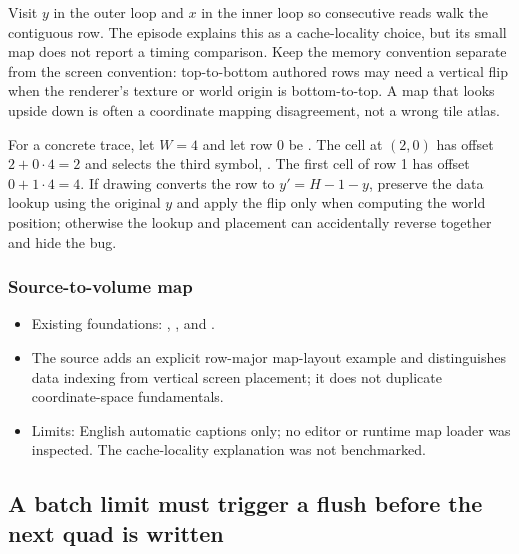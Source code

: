 Visit \(y\) in the outer loop and \(x\) in the inner loop so consecutive reads walk the contiguous row. The episode explains this as a cache-locality choice, but its small map does not report a timing comparison. Keep the memory convention separate from the screen convention: top-to-bottom authored rows may need a vertical flip when the renderer's texture or world origin is bottom-to-top. A map that looks upside down is often a coordinate mapping disagreement, not a wrong tile atlas.

For a concrete trace, let \(W=4\) and let row 0 be . The cell at \((2,0)\) has offset \(2+0\cdot4=2\) and selects the third symbol, . The first cell of row 1 has offset \(0+1\cdot4=4\). If drawing converts the row to \(y'=H-1-y\), preserve the data lookup using the original \(y\) and apply the flip only when computing the world position; otherwise the lookup and placement can accidentally reverse together and hide the bug.

\subsubsection{Source-to-volume map}\label{06-engine-ii-ch026-source-to-volume-map-2}

\hypertarget{06-engine-ii-ch026-source-to-volume-map-2}{}

\begin{itemize}
\tightlist
\item
  Existing foundations: , , and .
\item
  The source adds an explicit row-major map-layout example and distinguishes data indexing from vertical screen placement; it does not duplicate coordinate-space fundamentals.
\item
  Limits: English automatic captions only; no editor or runtime map loader was inspected. The cache-locality explanation was not benchmarked.
\end{itemize}

\subsection{A batch limit must trigger a flush before the next quad is written}\label{06-engine-ii-ch026-a-batch-limit-must-trigger-a-flush-before-the-next-quad-is-written}

